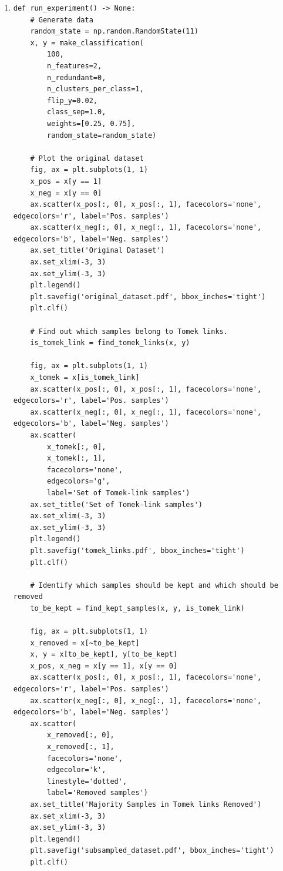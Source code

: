 \documentclass[a4paper]{article}
\begin{document}
{\begin{enumerate}
\item 
\begin{lstlisting}
def run_experiment() -> None:
    # Generate data
    random_state = np.random.RandomState(11)
    x, y = make_classification(
        100,
        n_features=2,
        n_redundant=0,
        n_clusters_per_class=1,
        flip_y=0.02,
        class_sep=1.0,
        weights=[0.25, 0.75],
        random_state=random_state)

    # Plot the original dataset
    fig, ax = plt.subplots(1, 1)
    x_pos = x[y == 1]
    x_neg = x[y == 0]
    ax.scatter(x_pos[:, 0], x_pos[:, 1], facecolors='none', edgecolors='r', label='Pos. samples')
    ax.scatter(x_neg[:, 0], x_neg[:, 1], facecolors='none', edgecolors='b', label='Neg. samples')
    ax.set_title('Original Dataset')
    ax.set_xlim(-3, 3)
    ax.set_ylim(-3, 3)
    plt.legend()
    plt.savefig('original_dataset.pdf', bbox_inches='tight')
    plt.clf()

    # Find out which samples belong to Tomek links.
    is_tomek_link = find_tomek_links(x, y)

    fig, ax = plt.subplots(1, 1)
    x_tomek = x[is_tomek_link]
    ax.scatter(x_pos[:, 0], x_pos[:, 1], facecolors='none', edgecolors='r', label='Pos. samples')
    ax.scatter(x_neg[:, 0], x_neg[:, 1], facecolors='none', edgecolors='b', label='Neg. samples')
    ax.scatter(
        x_tomek[:, 0],
        x_tomek[:, 1],
        facecolors='none',
        edgecolors='g',
        label='Set of Tomek-link samples')
    ax.set_title('Set of Tomek-link samples')
    ax.set_xlim(-3, 3)
    ax.set_ylim(-3, 3)
    plt.legend()
    plt.savefig('tomek_links.pdf', bbox_inches='tight')
    plt.clf()

    # Identify which samples should be kept and which should be removed
    to_be_kept = find_kept_samples(x, y, is_tomek_link)

    fig, ax = plt.subplots(1, 1)
    x_removed = x[~to_be_kept]
    x, y = x[to_be_kept], y[to_be_kept]
    x_pos, x_neg = x[y == 1], x[y == 0]
    ax.scatter(x_pos[:, 0], x_pos[:, 1], facecolors='none', edgecolors='r', label='Pos. samples')
    ax.scatter(x_neg[:, 0], x_neg[:, 1], facecolors='none', edgecolors='b', label='Neg. samples')
    ax.scatter(
        x_removed[:, 0],
        x_removed[:, 1],
        facecolors='none',
        edgecolor='k',
        linestyle='dotted',
        label='Removed samples')
    ax.set_title('Majority Samples in Tomek links Removed')
    ax.set_xlim(-3, 3)
    ax.set_ylim(-3, 3)
    plt.legend()
    plt.savefig('subsampled_dataset.pdf', bbox_inches='tight')
    plt.clf()



\end{lstlisting}
\end{enumerate}}
\end{document}
